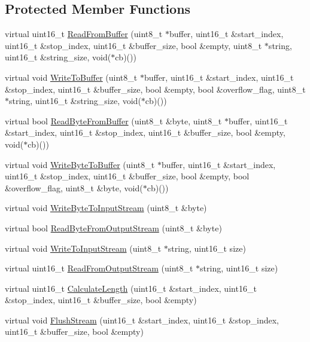 \subsection*{Protected Member Functions}
\begin{DoxyCompactItemize}
\item 
virtual uint16\+\_\+t \hyperlink{class_stream_a5108546d239c4f43d34f27e1e7aaa412}{Read\+From\+Buffer} (uint8\+\_\+t $\ast$buffer, uint16\+\_\+t \&start\+\_\+index, uint16\+\_\+t \&stop\+\_\+index, uint16\+\_\+t \&buffer\+\_\+size, bool \&empty, uint8\+\_\+t $\ast$string, uint16\+\_\+t \&string\+\_\+size, void($\ast$cb)())
\item 
virtual void \hyperlink{class_stream_ad4444f4f2a111a304bb0e25efc3a2cb2}{Write\+To\+Buffer} (uint8\+\_\+t $\ast$buffer, uint16\+\_\+t \&start\+\_\+index, uint16\+\_\+t \&stop\+\_\+index, uint16\+\_\+t \&buffer\+\_\+size, bool \&empty, bool \&overflow\+\_\+flag, uint8\+\_\+t $\ast$string, uint16\+\_\+t \&string\+\_\+size, void($\ast$cb)())
\item 
virtual bool \hyperlink{class_stream_a8a36f41b0b3965c3e7813a865ac86bae}{Read\+Byte\+From\+Buffer} (uint8\+\_\+t \&byte, uint8\+\_\+t $\ast$buffer, uint16\+\_\+t \&start\+\_\+index, uint16\+\_\+t \&stop\+\_\+index, uint16\+\_\+t \&buffer\+\_\+size, bool \&empty, void($\ast$cb)())
\item 
virtual void \hyperlink{class_stream_a0da4122369b2e625c8e4a224cc598a04}{Write\+Byte\+To\+Buffer} (uint8\+\_\+t $\ast$buffer, uint16\+\_\+t \&start\+\_\+index, uint16\+\_\+t \&stop\+\_\+index, uint16\+\_\+t \&buffer\+\_\+size, bool \&empty, bool \&overflow\+\_\+flag, uint8\+\_\+t \&byte, void($\ast$cb)())
\item 
virtual void \hyperlink{class_stream_a0784d377cc92ddde7cc730be17a1a3aa}{Write\+Byte\+To\+Input\+Stream} (uint8\+\_\+t \&byte)
\item 
virtual bool \hyperlink{class_stream_a3f8e3c5513c6b8605c0fed74a3ed22bc}{Read\+Byte\+From\+Output\+Stream} (uint8\+\_\+t \&byte)
\item 
virtual void \hyperlink{class_stream_aa2f020721d273ce821ccf626e5eb773c}{Write\+To\+Input\+Stream} (uint8\+\_\+t $\ast$string, uint16\+\_\+t size)
\item 
virtual uint16\+\_\+t \hyperlink{class_stream_ab458be72cc54330f518f5ab35ab84106}{Read\+From\+Output\+Stream} (uint8\+\_\+t $\ast$string, uint16\+\_\+t size)
\item 
virtual uint16\+\_\+t \hyperlink{class_stream_a8047b62e7dcfe0e50210b3e40c7aa6eb}{Calculate\+Length} (uint16\+\_\+t \&start\+\_\+index, uint16\+\_\+t \&stop\+\_\+index, uint16\+\_\+t \&buffer\+\_\+size, bool \&empty)
\item 
virtual void \hyperlink{class_stream_a435b1b065846d3b24969cfc6dacabc6b}{Flush\+Stream} (uint16\+\_\+t \&start\+\_\+index, uint16\+\_\+t \&stop\+\_\+index, uint16\+\_\+t \&buffer\+\_\+size, bool \&empty)
\end{DoxyCompactItemize}
